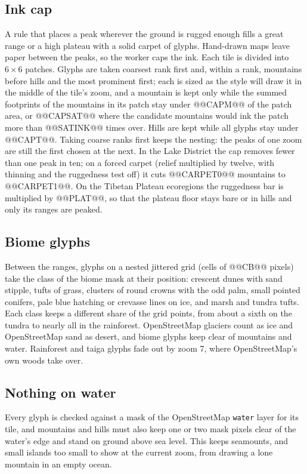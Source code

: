 \documentclass[11pt,a4paper]{article}
\begin{document}
\subsection{Ink cap}
A rule that places a peak wherever the ground is rugged enough fills a great range or a high plateau with a solid carpet of glyphs. Hand-drawn maps leave paper between the peaks, so the worker caps the ink. Each tile is divided into $6\times6$ patches. Glyphs are taken coarsest rank first and, within a rank, mountains before hills and the most prominent first; each is sized as the style will draw it in the middle of the tile's zoom, and a mountain is kept only while the summed footprints of the mountains in its patch stay under @@CAPM@@ of the patch area, or @@CAPSAT@@ where the candidate mountains would ink the patch more than @@SATINK@@ times over. Hills are kept while all glyphs stay under @@CAPT@@. Taking coarse ranks first keeps the nesting: the peaks of one zoom are still the first chosen at the next. In the Lake District the cap removes fewer than one peak in ten; on a forced carpet (relief multiplied by twelve, with thinning and the ruggedness test off) it cuts @@CARPET0@@ mountains to @@CARPET1@@. On the Tibetan Plateau ecoregions the ruggedness bar is multiplied by @@PLAT@@, so that the plateau floor stays bare or in hills and only its ranges are peaked.

\subsection{Biome glyphs}
Between the ranges, glyphs on a nested jittered grid (cells of @@CB@@ pixels) take the class of the biome mask at their position: crescent dunes with sand stipple, tufts of grass, clusters of round crowns with the odd palm, small pointed conifers, pale blue hatching or crevasse lines on ice, and marsh and tundra tufts. Each class keeps a different share of the grid points, from about a sixth on the tundra to nearly all in the rainforest. OpenStreetMap glaciers count as ice and OpenStreetMap sand as desert, and biome glyphs keep clear of mountains and water. Rainforest and taiga glyphs fade out by zoom 7, where OpenStreetMap's own woods take over.

\subsection{Nothing on water}
Every glyph is checked against a mask of the OpenStreetMap \texttt{water} layer for its tile, and mountains and hills must also keep one or two mask pixels clear of the water's edge and stand on ground above sea level. This keeps seamounts, and small islands too small to show at the current zoom, from drawing a lone mountain in an empty ocean.
\end{document}
